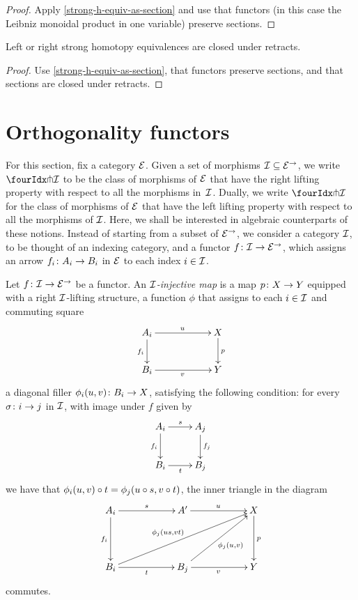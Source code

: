 \documentclass[reqno,10pt,a4paper,oneside]{amsart}
\begin{document}
\begin{proof}
Apply \cref{strong-h-equiv-as-section} and use that functors (in this case the Leibniz monoidal product in one variable) preserve sections.
\end{proof}

\begin{proposition}
\label{strong-h-equiv-closed-under-retract}
Left or right strong homotopy equivalences are closed under retracts.
\end{proposition}

\begin{proof}
Use \cref{strong-h-equiv-as-section},  that functors preserve sections, and that  sections are closed under retracts.
\end{proof}



\section{Orthogonality functors}
\label{sec:ortf}

For this section, fix a category $\catE$. Given a set of morphisms $\cal{I} \subseteq \catE^\to$, we 
write $\liftr{\cal{I}}$ to be the class of morphisms of $\catE$ that have 
the right lifting property with respect to all the morphisms in~$\cal{I}$. Dually, we write $\liftl{\cal{I}}$ for the class of morphisms of $\catE$ that have the left lifting property with respect to all the morphisms of $\cal{I}$. 
Here, we shall be interested in algebraic counterparts of these notions. Instead of starting from a subset of $\catE^\to$, we consider a category $\cal{I}$, to be thought of an indexing category, and a functor $f \co \cal{I} \to \catE^\to$, which assigns an arrow $f_i \co A_i \to B_i$ in $\catE$ to each index $i \in \cal{I}$.


 \begin{definition} Let $f \co \cal{I} \to \catE^\to$ be a functor. An \emph{$\cal{I}$-injective map}
 is a map $p \co X \to Y$ equipped with a right  $\cal{I}$-lifting structure, \ie 
 a function  $\phi$ that assigns to each $i \in \cal{I}$ and commuting square
\[
\xymatrix@C=2cm{
A_i \ar[r]^{u}   \ar[d]_{f_i} & X \ar[d]^p \\
B_i \ar[r]_{v} & Y}
\]
a diagonal filler $\phi_i(u, v) \co B_i \to X$, satisfying the following condition: for every $\sigma \co i \to j$ in $\cal{I}$, 
with image under $f$ given by
\[
\xymatrix{
A_i \ar[r]^s \ar[d]_{f_i} & A_j \ar[d]^{f_j}  \\
B_i \ar[r]_{t} & B_j}
\]
we have that $\phi_i(u, v) \cc t = \phi_j(u \circ s, v \circ t)$, \ie the inner triangle in the diagram
\[
\xymatrix@C=2cm@R=1.5cm{
A_i \ar[r]^s \ar[d]_{f_i} & A' \ar[r]^{u}  & X \ar[d]^p   \\
B_i \ar[r]_{t}  \ar[urr]^{\phi_j(us, v t) \quad } & B_j  \ar[r]_{v}  \ar[ur]_{\phi_{j}(u, v)} & Y }
\]
commutes. 
\end{definition}
\end{document}
